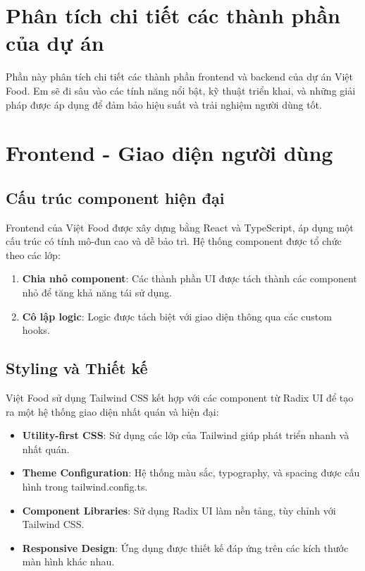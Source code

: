 \section{Phân tích chi tiết các thành phần của dự án}

Phần này phân tích chi tiết các thành phần frontend và backend của dự án Việt Food. Em sẽ đi sâu vào các tính năng nổi bật, kỹ thuật triển khai, và những giải pháp được áp dụng để đảm bảo hiệu suất và trải nghiệm người dùng tốt.

\section{Frontend - Giao diện người dùng}

\subsection{Cấu trúc component hiện đại}

Frontend của Việt Food được xây dựng bằng React và TypeScript, áp dụng một cấu trúc có tính mô-đun cao và dễ bảo trì. Hệ thống component được tổ chức theo các lớp:

\begin{enumerate}
    \item \textbf{Chia nhỏ component}: Các thành phần UI được tách thành các component nhỏ để tăng khả năng tái sử dụng.
    \item \textbf{Cô lập logic}: Logic được tách biệt với giao diện thông qua các custom hooks.
\end{enumerate}


\subsection{Styling và Thiết kế}

Việt Food sử dụng Tailwind CSS kết hợp với các component từ Radix UI để tạo ra một hệ thống giao diện nhất quán và hiện đại:

\begin{itemize}
    \item \textbf{Utility-first CSS}: Sử dụng các lớp của Tailwind giúp phát triển nhanh và nhất quán.
    \item \textbf{Theme Configuration}: Hệ thống màu sắc, typography, và spacing được cấu hình trong tailwind.config.ts.
    \item \textbf{Component Libraries}: Sử dụng Radix UI làm nền tảng, tùy chỉnh với Tailwind CSS.
    \item \textbf{Responsive Design}: Ứng dụng được thiết kế đáp ứng trên các kích thước màn hình khác nhau.
\end{itemize}


